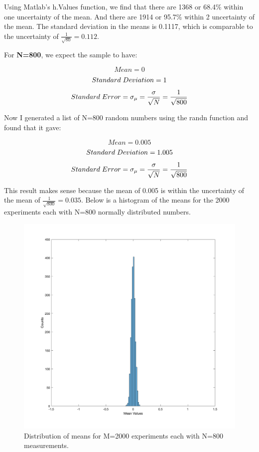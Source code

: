 \documentclass{article}
\begin{document}
Using Matlab’s h.Values function, we find that there are 1368  or 68.4\% within one uncertainty of the mean. And there are 1914 or 95.7\% within 2 uncertainty of the mean. The standard deviation in the means is 0.1117, which is comparable to the uncertainty of $\frac{1}{\sqrt{80}}=0.112$.  \newline


For \textbf{N=800}, we expect the sample to have:
 
 \[ Mean=0\]
  \[ Standard\hspace{1mm}Deviation=1\]
   \[ Standard\hspace{1mm}Error=\sigma_{\mu}=\frac{\sigma}{\sqrt{N}}=\frac{1}{\sqrt{800}}\] 


Now I generated a list of N=800 random numbers using the randn function and found that it gave:

 \[ Mean=0.005\]
  \[ Standard\hspace{1mm}Deviation=1.005\]
   \[ Standard\hspace{1mm}Error=\sigma_{\mu}=\frac{\sigma}{\sqrt{N}}=\frac{1}{\sqrt{800}}\] 
   
   This result makes sense because the mean of 0.005 is within the uncertainty of the mean of $\frac{1}{\sqrt{800}}=0.035$. Below is a histogram of the means for the 2000 experiments each with N=800 normally distributed numbers.
 

 \begin{figure}[H]
  \centering
  \includegraphics[width=0.8\linewidth]{lateximages/Prob3_4_800.png}
  \caption{Distribution of means for M=2000 experiments each with N=800 measurements.}
  \label{fig:boat1}
  \end{figure}
  
\end{document}
